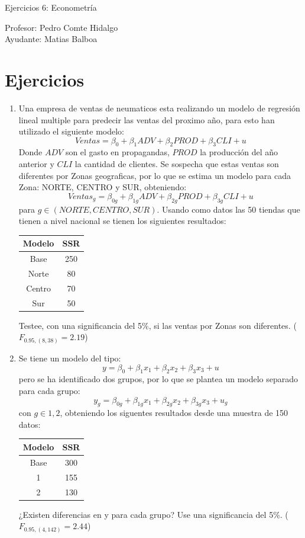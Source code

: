\documentclass[10pt,a4paper]{article}
\begin{document}
\vspace{5cm}

\begin{center}
    {\Large  Ejercicios 6: Econometría }

Profesor:    Pedro Comte Hidalgo \\
Ayudante: Matias Balboa
\end{center}



\section{Ejercicios}
\begin{enumerate}


\item Una empresa de ventas de neumaticos esta realizando un modelo de regresión lineal multiple para predecir las ventas del proximo año, para esto han utilizado el siguiente modelo:
$$Ventas = \beta_0 + \beta_1ADV + \beta_2PROD+\beta_3CLI + u$$
Donde $ADV$ son el gasto en propagandas, $PROD$ la producción del año anterior y $CLI$ la cantidad de clientes. Se sospecha que estas ventas son diferentes por Zonas geograficas, por lo que se estima un modelo para cada Zona: NORTE, CENTRO y SUR, obteniendo: 
$$Ventas_{g} = \beta_{0g} + \beta_{1g}ADV + \beta_{2g}PROD+\beta_{3g}CLI + u$$
para $g \in {(NORTE,CENTRO,SUR)}$. Usando como datos las 50 tiendas que tienen a nivel nacional se tienen los siguientes resultados:
\begin{center}
    \begin{tabular}{|c|c|}
    \hline
        Modelo & SSR \\
        \hline
        Base & 250 \\
        \hline
        Norte & 80 \\
        \hline
        Centro & 70 \\
        \hline
        Sur & 50 \\
        \hline
    \end{tabular}
\end{center}
Testee, con una significancia del 5\%, si las ventas por Zonas son diferentes. ($F_{0.95,(8,38)}=2.19$)


\item Se tiene un modelo del tipo:
$$y = \beta_0 + \beta_1x_1 + \beta_2x_2+\beta_3x_3 + u$$
pero se ha identificado dos grupos, por lo que se plantea un modelo separado para cada grupo:
$$y_g = \beta_{0g} + \beta_{1g}x_1 + \beta_{2g}x_2+\beta_{3g}x_3 + u_g$$
con $g\in {1,2}$, obteniendo los siguentes resultados desde una muestra de 150 datos:
\begin{center}
    \begin{tabular}{|c|c|}
    \hline
        Modelo & SSR \\
        \hline
        Base & 300 \\
        \hline
        1 & 155 \\
        \hline
        2 & 130 \\
        \hline
    \end{tabular}
\end{center}
¿Existen diferencias en y para cada grupo? Use una significancia del 5\%. ($F_{0.95,(4,142)}=2.44$)


\end{enumerate}
\end{document}
